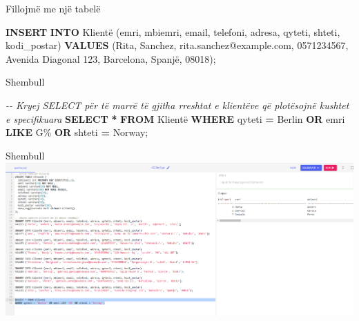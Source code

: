 \documentclass[
  ignorenonframetext,
]{beamer}
\newenvironment{Shaded}{\begin{snugshade}}{\end{snugshade}}
\newcommand{\CommentTok}[1]{\textcolor[rgb]{0.56,0.35,0.01}{\textit{#1}}}
\newcommand{\KeywordTok}[1]{\textcolor[rgb]{0.13,0.29,0.53}{\textbf{#1}}}
\newcommand{\NormalTok}[1]{#1}
\newcommand{\OperatorTok}[1]{\textcolor[rgb]{0.81,0.36,0.00}{\textbf{#1}}}
\newcommand{\StringTok}[1]{\textcolor[rgb]{0.31,0.60,0.02}{#1}}
\begin{document}
\begin{frame}[fragile]{Fillojmë me një tabelë}
\begin{Shaded}
\begin{Highlighting}[]
\KeywordTok{INSERT} \KeywordTok{INTO}\NormalTok{ Klientë (emri, mbiemri, email, telefoni, adresa, qyteti, shteti, kodi\_postar)}
\KeywordTok{VALUES}\NormalTok{ (}\StringTok{\textquotesingle{}Rita\textquotesingle{}}\NormalTok{, }\StringTok{\textquotesingle{}Sanchez\textquotesingle{}}\NormalTok{, }\StringTok{\textquotesingle{}rita.sanchez@example.com\textquotesingle{}}\NormalTok{, }\StringTok{\textquotesingle{}0571234567\textquotesingle{}}\NormalTok{, }\StringTok{\textquotesingle{}Avenida Diagonal 123\textquotesingle{}}\NormalTok{, }\StringTok{\textquotesingle{}Barcelona\textquotesingle{}}\NormalTok{, }\StringTok{\textquotesingle{}Spanjë\textquotesingle{}}\NormalTok{, }\StringTok{\textquotesingle{}08018\textquotesingle{}}\NormalTok{);}
\end{Highlighting}
\end{Shaded}
\end{frame}

\begin{frame}[fragile]{Shembull}
\label{shembull-35}
\begin{Shaded}
\begin{Highlighting}[]
\CommentTok{{-}{-} Kryej SELECT për të marrë të gjitha rreshtat e klientëve që plotësojnë kushtet e specifikuara}
\KeywordTok{SELECT} \OperatorTok{*} \KeywordTok{FROM}\NormalTok{ Klientë}
\KeywordTok{WHERE}\NormalTok{ qyteti }\OperatorTok{=} \StringTok{\textquotesingle{}Berlin\textquotesingle{}} \KeywordTok{OR}\NormalTok{ emri }\KeywordTok{LIKE} \StringTok{\textquotesingle{}G\%\textquotesingle{}} \KeywordTok{OR}\NormalTok{ shteti }\OperatorTok{=} \StringTok{\textquotesingle{}Norway\textquotesingle{}}\NormalTok{;}
\end{Highlighting}
\end{Shaded}
\end{frame}

\begin{frame}{Shembull}
\label{shembull-36}
\includegraphics{./Figs/query19.png}
\end{frame}
\end{document}
